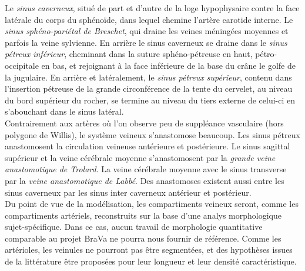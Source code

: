 Le {\em sinus caverneux}, situé de part et d’autre de la loge hypophysaire contre la face latérale du corps du sphénoïde, dans lequel chemine l’artère carotide interne. Le {\em sinus sphéno-pariétal de Breschet}, qui draine les veines méningées moyennes et parfois la veine sylvienne. En arrière le sinus caverneux se draine dans le {\em sinus pétreux inférieur}, cheminant dans la suture sphéno-pétreuse en haut, pétro-occipitale en bas, et rejoignant à la face inférieure de la base du crâne le golfe de la jugulaire. En arrière et latéralement, le {\em sinus pétreux supérieur}, contenu dans l’insertion pétreuse de la grande circonférence de la tente du cervelet, au niveau du bord supérieur du rocher, se termine au niveau du tiers externe de celui-ci en s’abouchant dans le sinus latéral.\\
Contrairement aux artères où l’on observe peu de suppléance vasculaire (hors polygone de Willis), le système veineux s’anastomose beaucoup. Les sinus pétreux anastomosent la circulation veineuse antérieure et postérieure. Le sinus sagittal supérieur et la veine cérébrale moyenne s’anastomosent par la {\em grande veine anastomotique de Trolard}. La veine cérébrale moyenne avec le sinus transverse par la {\em veine anastomotique de Labbé}. Des anastomoses existent aussi entre les sinus caverneux par les sinus inter caverneux antérieur et postérieur.\\
Du point de vue de la modélisation, les compartiments veineux seront, comme les compartiments artériels, reconstruits sur la base d'une analys morphologique sujet-spécifique. Dans ce cas, aucun travail de morphologie quantitative comparable au projet BraVa ne pourra nous fournir de référence. Comme les artérioles, les veinules ne pourront pas être segmentées, et des hypothèses issues de la littérature être proposées pour leur longueur et leur densité caractéristique.  
